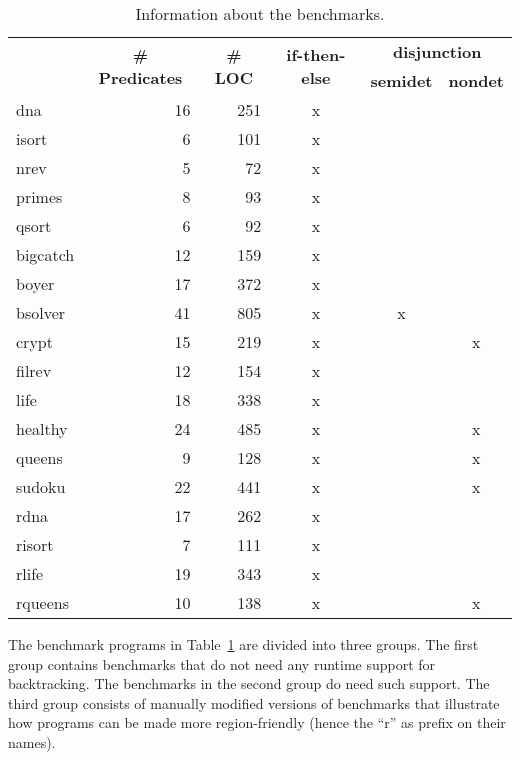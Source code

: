 \documentclass{tlp}
\begin{document}
\begin{table}[htb]
  \centering
  \small
  \caption{Information about the benchmarks.}
  \begin{tabular}{l|*{2}{r|}*{3}{c|}}
    \hline
    \hline
    \multirow{2}{*}{}
    & \multicolumn{1}{c|}{\multirow{2}{*}{\textbf{\# Predicates}}}
    & \multicolumn{1}{c|}{\multirow{2}{*}{\textbf{\# LOC}}}
    & \multicolumn{1}{c|}{\multirow{2}{*}{\textbf{if-then-else}}}
    & \multicolumn{2}{c|}{\textbf{disjunction}} \\
    & & &
    & \multicolumn{1}{c}{\textbf{semidet}}
    & \multicolumn{1}{c|}{\textbf{nondet}} \\
    \hline
    dna      & 16 & 251 & x &   &   \\
    isort    &  6 & 101 & x &   &   \\
    nrev     &  5 &  72 & x &   &   \\
    primes   &  8 &  93 & x &   &   \\
    qsort    &  6 &  92 & x &   &   \\
    \hline
    bigcatch & 12 & 159 & x &   &   \\
    boyer    & 17 & 372 & x &   &   \\
    bsolver  & 41 & 805 & x & x &   \\
    crypt    & 15 & 219 & x &   & x \\
    filrev   & 12 & 154 & x &   &   \\
    life     & 18 & 338 & x &   &   \\
    healthy  & 24 & 485 & x &   & x \\
    queens   &  9 & 128 & x &   & x \\
    sudoku   & 22 & 441 & x &   & x \\
    \hline
    rdna     & 17 & 262 & x &   &   \\
    risort   &  7 & 111 & x &   &   \\
    rlife    & 19 & 343 & x &   &   \\
    rqueens  & 10 & 138 & x &   & x \\
    \hline
    \hline
  \end{tabular}
  \normalsize
  \label{table:experiment:benchmarks}
\end{table}

The benchmark programs in Table~\ref{table:experiment:benchmarks}
are divided into three groups.
The first group contains benchmarks
that do not need any runtime support for backtracking.
The benchmarks in the second group do need such support.
The third group consists of manually modified versions of benchmarks
that illustrate how programs can be made more region-friendly
(hence the ``r'' as prefix on their names).
\end{document}
